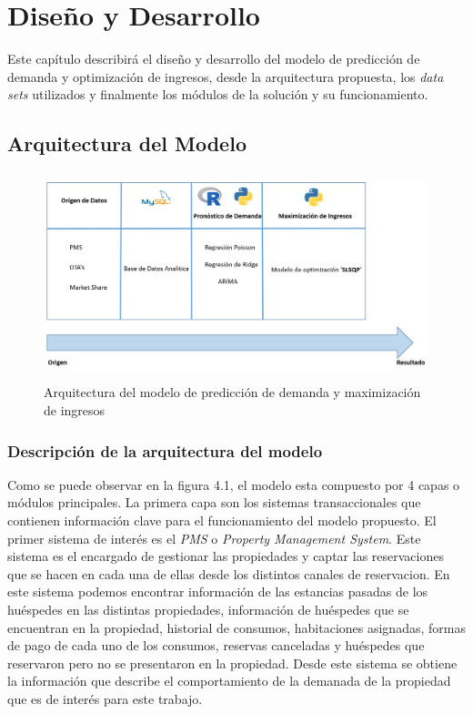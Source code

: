 \chapter{Diseño y Desarrollo}
\label{ch:modelo}

Este capítulo describirá el diseño y desarrollo del modelo de predicción de demanda y optimización de ingresos, desde la arquitectura propuesta, los \emph{data sets} utilizados y finalmente los módulos de la solución y su funcionamiento.

\section*{Arquitectura del Modelo}

\begin{figure}[H]
  \centering
      \includegraphics[width=\maxwidth,height=6cm]{figures/Arquitectura.png}  
  \caption{Arquitectura del modelo de predicción de demanda y maximización de ingresos}
\end{figure}

\subsection*{Descripción de la arquitectura del modelo}

Como se puede observar en la figura 4.1, el modelo esta compuesto por 4 capas o módulos principales. La primera capa son los sistemas transaccionales que contienen información clave para el funcionamiento del modelo propuesto. El primer sistema de interés es el \emph{PMS} o \emph{Property Management System}. Este sistema es el encargado de gestionar las propiedades y captar las reservaciones que se hacen en cada una de ellas desde los distintos canales de reservacion. En este sistema podemos encontrar información de las estancias pasadas de los huéspedes en las distintas propiedades, información de huéspedes que se encuentran en la propiedad, historial de consumos, habitaciones asignadas, formas de pago de cada uno de los consumos, reservas canceladas y huéspedes que reservaron pero no se presentaron en la propiedad. Desde este sistema se obtiene la información que describe el comportamiento de la demanada de la propiedad que es de interés para este trabajo.

